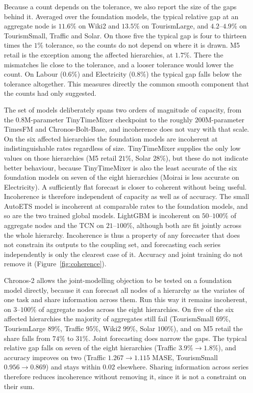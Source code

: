 \documentclass[review,number]{elsarticle}
\begin{document}
Because a count depends on the tolerance, we also report the size of the gaps behind it.
Averaged over the foundation models, the typical relative gap at an aggregate node is
$11.6\%$ on Wiki2 and $13.5\%$ on TourismLarge, and $4.2$--$4.9\%$ on TourismSmall,
Traffic and Solar. On those five the typical gap is four to thirteen times the $1\%$
tolerance, so the counts do not depend on where it is drawn. M5 retail is the
exception among the affected hierarchies, at $1.7\%$. There the mismatches lie close to
the tolerance, and a looser tolerance would lower the count. On Labour ($0.6\%$) and
Electricity ($0.8\%$) the typical gap falls below the tolerance altogether. This
measures directly the common smooth component that the counts had only suggested.

The set of models deliberately spans two orders of magnitude of capacity, from the
$0.8$M-parameter TinyTimeMixer checkpoint to the roughly $200$M-parameter TimesFM and
Chronos-Bolt-Base, and incoherence does
not vary with that scale. On the six affected hierarchies the foundation models are
incoherent at indistinguishable rates regardless of size. TinyTimeMixer supplies the
only low values on those hierarchies (M5 retail $21\%$, Solar $28\%$), but these do not
indicate better behaviour, because TinyTimeMixer is also the least accurate of the six
foundation models on seven of the eight hierarchies (Moirai is less accurate on
Electricity). A sufficiently flat forecast is closer to
coherent without being useful. Incoherence is therefore independent of capacity as well
as of accuracy. The small AutoETS model is incoherent at comparable rates
to the foundation models, and so are the two trained global models. LightGBM is
incoherent on $50$--$100\%$ of aggregate nodes and the TCN on $21$--$100\%$, although
both are fit jointly across the whole hierarchy. Incoherence is thus a property of any
forecaster that does not constrain its outputs to the coupling set, and forecasting
each series independently is only the clearest case of it. Accuracy and joint training
do not remove it (Figure~\ref{fig:coherence}).

Chronos-2 allows the joint-modelling objection to be tested on a foundation model
directly, because it can forecast all nodes of a hierarchy as the variates of one task
and share information across them. Run this way it remains incoherent, on $3$--$100\%$
of aggregate nodes across the eight hierarchies. On five of the six affected hierarchies
the majority of aggregates still fail (TourismSmall $69\%$, TourismLarge $89\%$, Traffic
$95\%$, Wiki2 $99\%$, Solar $100\%$), and on M5 retail the share falls from $74\%$ to
$31\%$. Joint forecasting does narrow the gaps. The typical relative gap falls on seven
of the eight hierarchies (Traffic $3.9\% \to 1.8\%$), and accuracy improves on two
(Traffic $1.267 \to 1.115$ MASE, TourismSmall $0.956 \to 0.869$) and stays within $0.02$
elsewhere. Sharing information across series therefore reduces incoherence without
removing it, since it is not a constraint on their sum.
\end{document}
